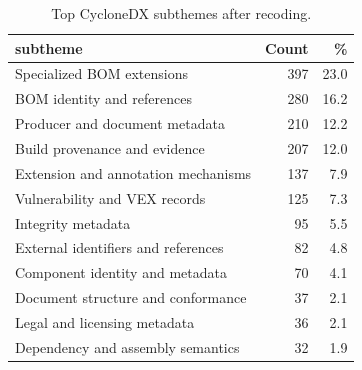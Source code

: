 \begin{table}[t]
\caption{Top CycloneDX subthemes after recoding.}
\label{tab:cdx-top-subthemes}
\centering
\small
\begin{tabularx}{\columnwidth}{@{}Xrr@{}}
\toprule
\textbf{subtheme} & \textbf{Count} & \textbf{\%} \\
\midrule
Specialized BOM extensions & 397 & 23.0 \\
BOM identity and references & 280 & 16.2 \\
Producer and document metadata & 210 & 12.2 \\
Build provenance and evidence & 207 & 12.0 \\
Extension and annotation mechanisms & 137 & 7.9 \\
Vulnerability and VEX records & 125 & 7.3 \\
Integrity metadata & 95 & 5.5 \\
External identifiers and references & 82 & 4.8 \\
Component identity and metadata & 70 & 4.1 \\
Document structure and conformance & 37 & 2.1 \\
Legal and licensing metadata & 36 & 2.1 \\
Dependency and assembly semantics & 32 & 1.9 \\
\bottomrule
\end{tabularx}
\end{table}
